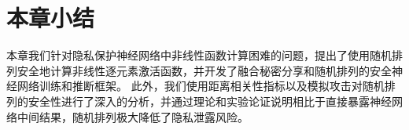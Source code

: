 \section{本章小结}
本章我们针对隐私保护神经网络中非线性函数计算困难的问题，提出了使用随机排列安全地计算非线性逐元素激活函数，并开发了融合秘密分享和随机排列的安全神经网络训练和推断框架。
%
此外，我们使用距离相关性指标以及模拟攻击对随机排列的安全性进行了深入的分析，并通过理论和实验论证说明相比于直接暴露神经网络中间结果，随机排列极大降低了隐私泄露风险。